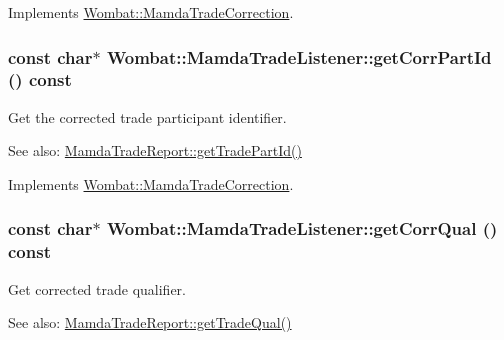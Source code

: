 Implements \hyperlink{classWombat_1_1MamdaTradeCorrection_39f75a7442d2c2a507f491b323536eaf}{Wombat::Mamda\-Trade\-Correction}.\hypertarget{classWombat_1_1MamdaTradeListener_efa0c3d21cf4d4bb0443c66c20dffc33}{
\subsubsection[getCorrPartId]{\setlength{\rightskip}{0pt plus 5cm}const char$\ast$ Wombat::Mamda\-Trade\-Listener::get\-Corr\-Part\-Id () const}}
\label{classWombat_1_1MamdaTradeListener_efa0c3d21cf4d4bb0443c66c20dffc33}


Get the corrected trade participant identifier. 

\begin{Desc}
\item[See also:]\hyperlink{classWombat_1_1MamdaTradeReport_eb865e0b7c57732356d925d532364c7b}{Mamda\-Trade\-Report::get\-Trade\-Part\-Id()} \end{Desc}


Implements \hyperlink{classWombat_1_1MamdaTradeCorrection_221aff95289be7e4a10043b045eba11b}{Wombat::Mamda\-Trade\-Correction}.\hypertarget{classWombat_1_1MamdaTradeListener_cbb0d0f341ddad192a5c83ce148cea9f}{
\subsubsection[getCorrQual]{\setlength{\rightskip}{0pt plus 5cm}const char$\ast$ Wombat::Mamda\-Trade\-Listener::get\-Corr\-Qual () const}}
\label{classWombat_1_1MamdaTradeListener_cbb0d0f341ddad192a5c83ce148cea9f}


Get corrected trade qualifier. 

\begin{Desc}
\item[See also:]\hyperlink{classWombat_1_1MamdaTradeReport_01f6e34bc27e4c6a9d2262327c2961d7}{Mamda\-Trade\-Report::get\-Trade\-Qual()} \end{Desc}


